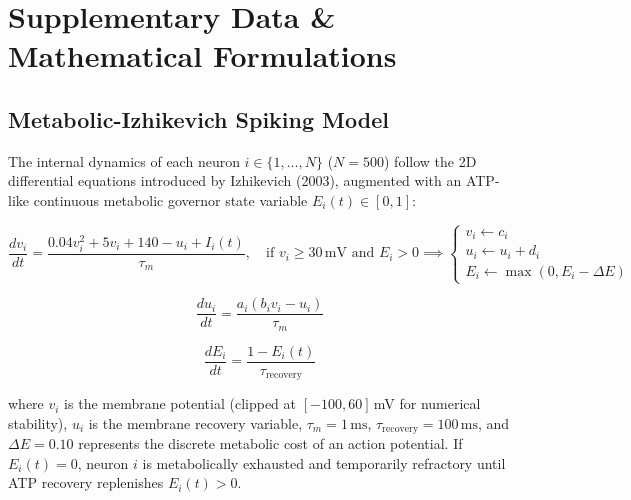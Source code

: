 \documentclass[utf8]{frontiers_suppmat}
\begin{document}
\onecolumn
{}

\title[Supplementary Material]{{}}

\maketitle

\section{Supplementary Data & Mathematical Formulations}

\subsection{Metabolic-Izhikevich Spiking Model}
The internal dynamics of each neuron $i \in \{1, \dots, N\}$ ($N = 500$) follow the 2D differential equations introduced by Izhikevich (2003), augmented with an ATP-like continuous metabolic governor state variable $E_i(t) \in [0, 1]$:

\begin{equation}
\frac{dv_i}{dt} = \frac{0.04 v_i^2 + 5 v_i + 140 - u_i + I_i(t)}{\tau_m}, \quad \text{if } v_i \ge 30\,\text{mV} \text{ and } E_i > 0 \implies \begin{cases} v_i \leftarrow c_i \\ u_i \leftarrow u_i + d_i \\ E_i \leftarrow \max(0, E_i - \Delta E) \end{cases}
\end{equation}

\begin{equation}
\frac{du_i}{dt} = \frac{a_i (b_i v_i - u_i)}{\tau_m}
\end{equation}

\begin{equation}
\frac{dE_i}{dt} = \frac{1 - E_i(t)}{\tau_{\text{recovery}}}
\end{equation}

where $v_i$ is the membrane potential (clipped at $[-100, 60]$\,mV for numerical stability), $u_i$ is the membrane recovery variable, $\tau_m = 1\,\text{ms}$, $\tau_{\text{recovery}} = 100\,\text{ms}$, and $\Delta E = 0.10$ represents the discrete metabolic cost of an action potential. If $E_i(t) = 0$, neuron $i$ is metabolically exhausted and temporarily refractory until ATP recovery replenishes $E_i(t) > 0$.
\end{document}
